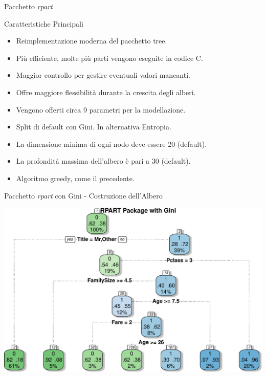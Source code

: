 \documentclass[9pt, xcolor=table]{beamer}
\begin{document}
	\begin{frame}{Pacchetto \textit{rpart}}		
		\begin{block}{Caratteristiche Principali}
			\begin{itemize}
				\item Reimplementazione moderna del pacchetto tree.
				\item Più efficiente, molte più parti vengono eseguite in codice C.
				\item Maggior controllo per gestire eventuali valori mancanti.
				\item Offre maggiore flessibilità durante la crescita degli alberi.
				\item Vengono offerti circa 9 parametri per la modellazione.
				\item Split di default con Gini. In	alternativa Entropia.
				\item La dimensione minima di ogni nodo deve essere 20 (default).
				\item La profondità massima dell'albero è pari a 30 (default).
				\item Algoritmo greedy, come il precedente.
			\end{itemize}
		\end{block}
	\end{frame}

	\begin{frame}{Pacchetto \textit{rpart} con Gini - Costruzione dell'Albero}
		
		
		\vfill
		
		\centering
		\includegraphics[scale=0.46]{rpart-gini-tree}
		
	\end{frame}
\end{document}
